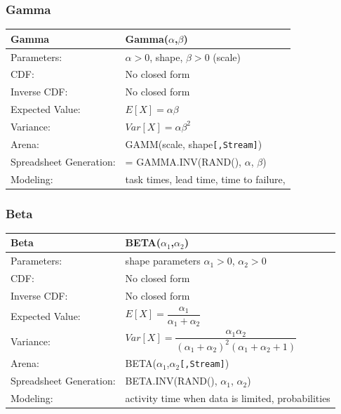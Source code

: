 \documentclass[
]{book}
\theoremstyle{definition}
\theoremstyle{definition}
\theoremstyle{definition}
\theoremstyle{definition}
\theoremstyle{remark}
\begin{document}
\hypertarget{gamma}{%
\subsubsection*{Gamma}\label{gamma}}


\begin{longtable}[]{@{}ll@{}}
\toprule
\textbf{Gamma} & Gamma(\(\alpha\),\(\beta\)) \\
\midrule
\endhead
Parameters: & \(\alpha > 0\), shape, \(\beta > 0\) (scale) \\
CDF: & No closed form \\
Inverse CDF: & No closed form \\
Expected Value: & \(E[X] = \alpha \beta\) \\
Variance: & \(Var[X] = \alpha \beta^2\) \\
Arena: & GAMM(scale, shape\texttt{{[},Stream{]}}) \\
Spreadsheet Generation: & = GAMMA.INV(RAND(), \(\alpha\), \(\beta\)) \\
Modeling: & task times, lead time, time to failure, \\
\bottomrule
\end{longtable}

\hypertarget{beta}{%
\subsubsection*{Beta}\label{beta}}


\begin{longtable}[]{@{}ll@{}}
\toprule
\textbf{Beta} & BETA(\(\alpha_1\),\(\alpha_2\)) \\
\midrule
\endhead
Parameters: & shape parameters \(\alpha_1 >0\), \(\alpha_2 >0\) \\
CDF: & No closed form \\
Inverse CDF: & No closed form \\
Expected Value: & \(E[X] = \dfrac{\alpha_1}{\alpha_1 + \alpha_2}\) \\
Variance: & \(Var[X] = \dfrac{\alpha_1\alpha_2}{(\alpha_1 + \alpha_2)^2(\alpha_1 + \alpha_2+1)}\) \\
Arena: & BETA(\(\alpha_1\),\(\alpha_2\)\texttt{{[},Stream{]}}) \\
Spreadsheet Generation: & BETA.INV(RAND(), \(\alpha_1\), \(\alpha_2\)) \\
Modeling: & activity time when data is limited, probabilities \\
\bottomrule
\end{longtable}
\end{document}
